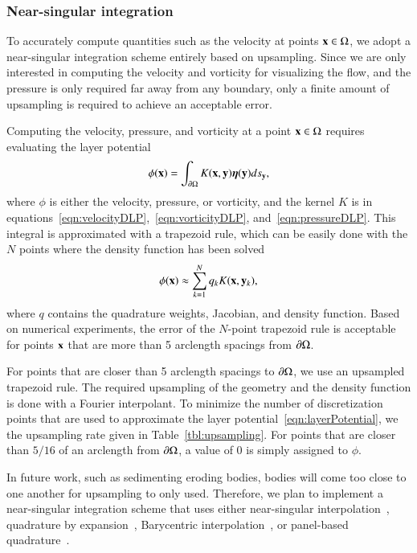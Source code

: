 \documentclass[preprint, 10pt]{elsarticle}
\begin{document}
\subsubsection{Near-singular integration}
To accurately compute quantities such as the velocity at points ${\mathbf{x}} \in
\Omega$, we adopt a near-singular integration scheme entirely based on
upsampling.  Since we are only interested in computing the velocity and
vorticity for visualizing the flow, and the pressure is only required
far away from any boundary, only a finite amount of upsampling is
required to achieve an acceptable error.

Computing the velocity, pressure, and vorticity at a point ${\mathbf{x}} \in
\Omega$ requires evaluating the layer potential
\begin{align*}
  \phi({\mathbf{x}}) = \int_{{\partial}\Omega} K({\mathbf{x}},{\mathbf{y}}) {\boldsymbol\eta}({\mathbf{y}}) ds_{\mathbf{y}},
\end{align*}
where $\phi$ is either the velocity, pressure, or vorticity, and the
kernel $K$ is in
equations~\eqref{eqn:velocityDLP},~\eqref{eqn:vorticityDLP},
and~\eqref{eqn:pressureDLP}.  This integral is approximated with a
trapezoid rule, which can be easily done with the $N$ points where the
density function has been solved
\begin{align}
  \phi({\mathbf{x}}) \approx \sum_{k=1}^N q_k K({\mathbf{x}},{\mathbf{y}}_k),
  \label{eqn:layerPotential}
\end{align}
where $q$ contains the quadrature weights, Jacobian, and density
function.  Based on numerical experiments, the error of the $N$-point
trapezoid rule is acceptable for points ${\mathbf{x}}$ that are more than 5
arclength spacings from ${\partial}\Omega$.

For points that are closer than 5 arclength spacings to ${\partial}\Omega$, we
use an upsampled trapezoid rule.  The required upsampling of the
geometry and the density function is done with a Fourier interpolant.
To minimize the number of discretization points that are used to
approximate the layer potential~\eqref{eqn:layerPotential}, we the
upsampling rate given in Table~\ref{tbl:upsampling}.  For points that
are closer than $5/16$ of an arclength from ${\partial}\Omega$, a value of 0 is
simply assigned to $\phi$.

In future work, such as sedimenting eroding bodies, bodies will come too
close to one another for upsampling to only used.  Therefore, we plan to
implement a near-singular integration scheme that uses either
near-singular interpolation~\cite{qua-bir2014a}, quadrature by
expansion~\cite{klo-bar-gre-one2013}, Barycentric
interpolation~\cite{bar-wu-vee2015}, or panel-based
quadrature~\cite{hel-oja2008a}.
\end{document}
